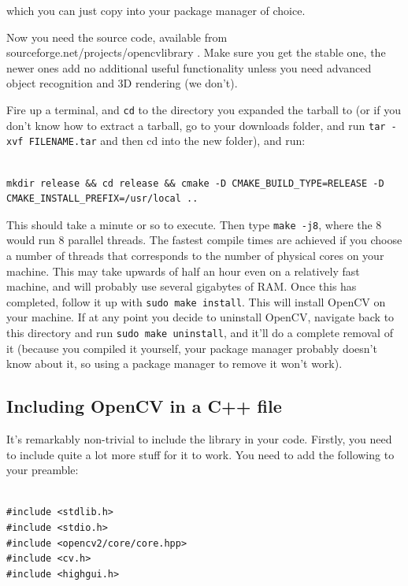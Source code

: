 \documentclass[12pt,a4paper]{article}
\begin{document}
which you can just copy into your package manager of choice.

Now you need the source code, available from sourceforge.net/projects/opencvlibrary . Make sure you get the stable one, the newer ones add no additional useful functionality unless you need advanced object recognition and 3D rendering (we don't).

Fire up a terminal, and \texttt{cd} to the directory you expanded the tarball to (or if you don't know how to extract a tarball, go to your downloads folder, and run \texttt{tar -xvf FILENAME.tar} and then cd into the new folder), and run:

\lstset{language=bash}
\begin{lstlisting}

mkdir release && cd release && cmake -D CMAKE_BUILD_TYPE=RELEASE -D CMAKE_INSTALL_PREFIX=/usr/local ..

\end{lstlisting}

This should take a minute or so to execute. Then type \texttt{make -j8}, where the 8 would run 8 parallel threads. The fastest compile times are achieved if you choose a number of threads that corresponds to the number of physical cores on your machine. This may take upwards of half an hour even on a relatively fast machine, and will probably use several gigabytes of RAM. Once this has completed, follow it up with \texttt{sudo make install}. This will install OpenCV on your machine. If at any point you decide to uninstall OpenCV, navigate back to this directory and run \texttt{sudo make uninstall}, and it'll do a complete removal of it (because you compiled it yourself, your package manager probably doesn't know about it, so using a package manager to remove it won't work).


\subsection{Including OpenCV in a C++ file}

It's remarkably non-trivial to include the library in your code. Firstly, you need to include quite a lot more stuff for it to work. You need to add the following to your preamble:

\lstset{language=C++}
\begin{lstlisting}

#include <stdlib.h>
#include <stdio.h>
#include <opencv2/core/core.hpp>
#include <cv.h>
#include <highgui.h>

\end{lstlisting}
\end{document}
